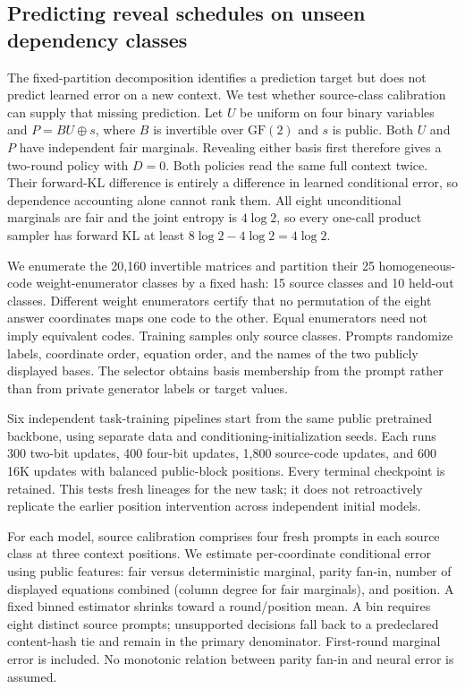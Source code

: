 \subsection{Predicting reveal schedules on unseen dependency classes}
The fixed-partition decomposition identifies a prediction target but does not
predict learned error on a new context. We test whether source-class calibration
can supply that missing prediction. Let $U$ be uniform on four binary variables
and $P=BU\oplus s$, where $B$ is invertible over $\mathrm{GF}(2)$ and $s$ is public.
Both $U$ and $P$ have independent fair marginals. Revealing either basis first
therefore gives a two-round policy with $D=0$. Both policies read the same full
context twice. Their forward-KL difference is entirely a difference in learned
conditional error, so dependence accounting alone cannot rank them. All eight unconditional
marginals are fair and the joint entropy is $4\log2$, so every one-call product
sampler has forward KL at least $8\log2-4\log2=4\log2$.

We enumerate the 20,160 invertible matrices and partition their 25 homogeneous-code
weight-enumerator classes by a fixed hash: 15 source classes and 10 held-out
classes. Different weight enumerators certify that no permutation of the eight
answer coordinates maps one code to the other. Equal enumerators need not imply
equivalent codes. Training samples only source classes. Prompts randomize labels,
coordinate order, equation order, and the names of the two publicly displayed
bases. The selector obtains basis membership from the prompt rather than from
private generator labels or target values.

Six independent task-training pipelines start from the same public pretrained
backbone, using separate data and conditioning-initialization seeds. Each runs
300 two-bit updates, 400 four-bit updates, 1,800 source-code updates, and 600
16K updates with balanced public-block positions. Every terminal checkpoint is
retained. This tests fresh lineages for the new task; it does not retroactively
replicate the earlier position intervention across independent initial models.

For each model, source calibration comprises four fresh prompts in each source
class at three context positions. We estimate per-coordinate conditional error
using public features: fair versus deterministic marginal, parity fan-in,
number of displayed equations combined (column degree for fair marginals), and
position. A fixed binned estimator shrinks toward a round/position mean. A bin
requires eight distinct source prompts; unsupported decisions fall back to a
predeclared content-hash tie and remain in the primary denominator. First-round
marginal error is included. No monotonic relation between parity fan-in and
neural error is assumed.

